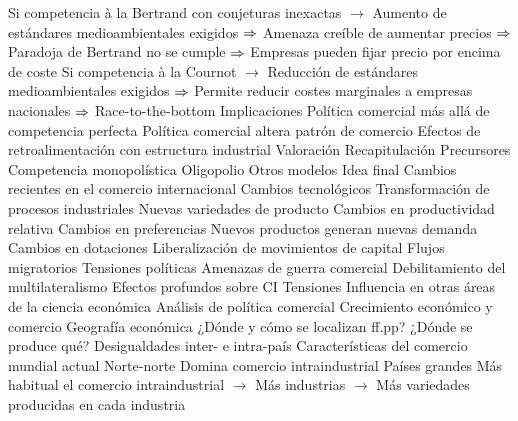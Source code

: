 \documentclass{nuevotema}
\begin{document}
\begin{esquemal}
				\4[] Si competencia à la Bertrand con conjeturas inexactas
				\4[] $\to$ Aumento de estándares medioambientales exigidos
				\4[] $\then$ Amenaza creíble de aumentar precios
				\4[] $\then$ Paradoja de Bertrand no se cumple
				\4[] $\then$ Empresas pueden fijar precio por encima de coste
				\4[] Si competencia à la Cournot
				\4[] $\to$ Reducción de estándares medioambientales exigidos
				\4[] $\then$ Permite reducir costes marginales a empresas nacionales
				\4[] $\then$ Race-to-the-bottom
			\3 Implicaciones
				\4 Política comercial más allá de competencia perfecta
				\4 Política comercial
				\4[] altera patrón de comercio
				\4[] Efectos de retroalimentación con estructura industrial
			\3 Valoración
	\1[] 
		\2 Recapitulación
			\3 Precursores
			\3 Competencia monopolística
			\3 Oligopolio
			\3 Otros modelos
		\2 Idea final
			\3 Cambios recientes en el comercio internacional
				\4 Cambios tecnológicos
				\4[] Transformación de procesos industriales
				\4[] Nuevas variedades de producto
				\4[] Cambios en productividad relativa
				\4 Cambios en preferencias
				\4[] Nuevos productos generan nuevas demanda
				\4 Cambios en dotaciones
				\4[] Liberalización de movimientos de capital
				\4[] Flujos migratorios
				\4 Tensiones políticas
				\4[] Amenazas de guerra comercial
				\4[] Debilitamiento del multilateralismo
				\4[$\then$] Efectos profundos sobre CI
				\4 Tensiones
			\3 Influencia en otras áreas de la ciencia económica
				\4 Análisis de política comercial
				\4 Crecimiento económico y comercio
				\4 Geografía económica
				\4[] ¿Dónde y cómo se localizan ff.pp?
				\4[] ¿Dónde se produce qué?
				\4 Desigualdades inter- e intra-país
			\3 Características del comercio mundial actual
				\4 Norte-norte
				\4[] Domina comercio intraindustrial
				\4 Países grandes
				\4[] Más habitual el comercio intraindustrial
				\4[] $\to$ Más industrias
				\4[] $\to$ Más variedades producidas en cada industria
\end{esquemal}

\graficas
\end{document}
